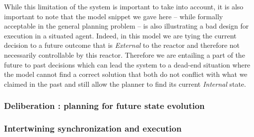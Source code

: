 While this limitation of the system is important to take into account,
it is also important to note that the model snippet we gave here --
while formally acceptable in the general planning problem -- is also
illustrating a bad design for execution in a situated agent. Indeed,
in this model we are tying the current decision to a future outcome
that is {\em External} to the reactor and therefore not necessarily
controllable by this reactor. Therefore we are entailing a part of the
future to past decisions which can lead the system to a dead-end
situation where the model cannot find a correct solution that both do
not conflict with what we claimed in the past and still allow the
planner to find its current {\em Internal} state.


\subsubsection{Deliberation : planning for future state evolution}
\label{sec:arch:plan}


\subsubsection{Intertwining synchronization and execution }
\label{sec:arch:intertwine}







